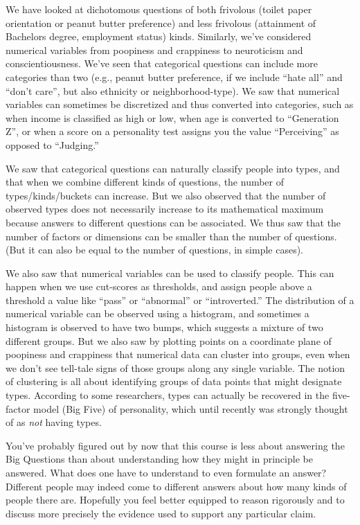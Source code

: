 \documentclass[openany]{book}
\begin{document}
We have looked at dichotomous questions of both frivolous (toilet paper orientation or peanut butter preference) and less frivolous (attainment of Bachelors degree, employment status) kinds. Similarly, we've considered numerical variables from poopiness and crappiness to neuroticism and conscientiousness. We've seen that categorical questions can include more categories than two (e.g., peanut butter preference, if we include ``hate all'' and ``don't care'', but also ethnicity or neighborhood-type). We saw that numerical variables can sometimes be discretized and thus converted into categories, such as when income is classified as high or low, when age is converted to ``Generation Z'', or when a score on a personality test assigns you the value ``Perceiving'' as opposed to ``Judging.''

We saw that categorical questions can naturally classify people into types, and that when we combine different kinds of questions, the number of types/kinds/buckets can increase. But we also observed that the number of observed types does not necessarily increase to its mathematical maximum because answers to different questions can be associated. We thus saw that the number of factors or dimensions can be smaller than the number of questions. (But it can also be equal to the number of questions, in simple cases).

We also saw that numerical variables can be used to classify people. This can happen when we use cut-scores as thresholds, and assign people above a threshold a value like ``pass'' or ``abnormal'' or ``introverted.'' The distribution of a numerical variable can be observed using a histogram, and sometimes a histogram is observed to have two bumps, which suggests a mixture of two different groups. But we also saw by plotting points on a coordinate plane of poopiness and crappiness that numerical data can cluster into groups, even when we don't see tell-tale signs of those groups along any single variable. The notion of clustering is all about identifying groups of data points that might designate types. According to some researchers, types can actually be recovered in the five-factor model (Big Five) of personality, which until recently was strongly thought of as \emph{not} having types.

You've probably figured out by now that this course is less about answering the Big Questions than about understanding how they might in principle be answered. What does one have to understand to even formulate an answer? Different people may indeed come to different answers about how many kinds of people there are. Hopefully you feel better equipped to reason rigorously and to discuss more precisely the evidence used to support any particular claim.
\end{document}
